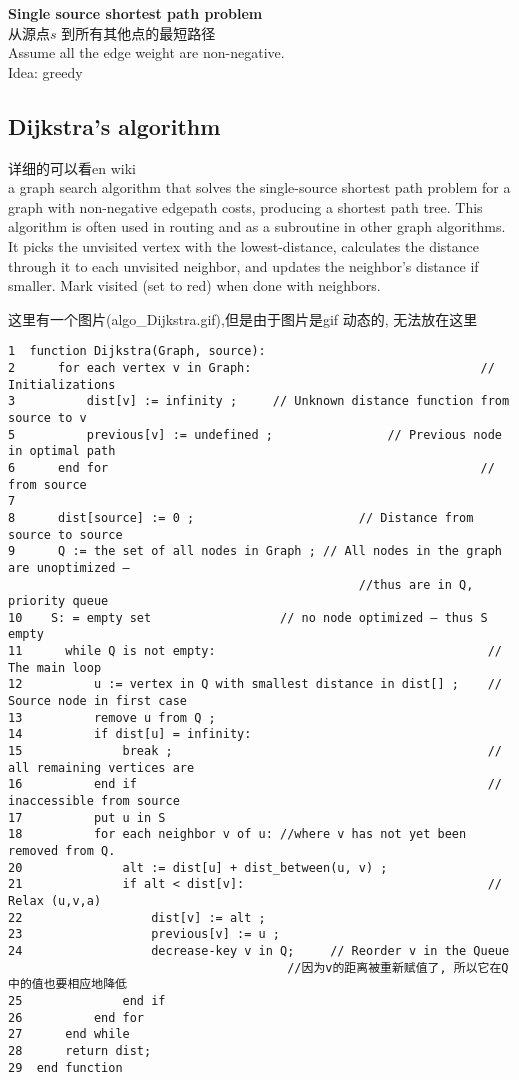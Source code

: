 \documentclass{article}
\begin{document}
\textbf{Single source shortest path problem}\\
从源点$s$ 到所有其他点的最短路径\\
Assume all the edge weight are non-negative.\\
Idea: greedy

\subsection{Dijkstra's algorithm}
详细的可以看en wiki\\
a graph search algorithm that solves the single-source shortest path problem for a graph with non-negative edgepath costs, producing a shortest path tree. This algorithm is often used in routing and as a subroutine in other graph algorithms.\\
It picks the unvisited vertex with the lowest-distance, calculates the distance through it to each unvisited neighbor, and updates the neighbor's distance if smaller. Mark visited (set to red) when done with neighbors.

这里有一个图片(algo\_Dijkstra.gif),但是由于图片是gif 动态的, 无法放在这里
\begin{verbatim}
1  function Dijkstra(Graph, source):
2      for each vertex v in Graph:                                // Initializations
3          dist[v] := infinity ;     // Unknown distance function from source to v
5          previous[v] := undefined ;                // Previous node in optimal path
6      end for                                                    // from source
7
8      dist[source] := 0 ;                       // Distance from source to source
9      Q := the set of all nodes in Graph ; // All nodes in the graph are unoptimized –
                                                 //thus are in Q, priority queue
10    S: = empty set                  // no node optimized – thus S empty
11      while Q is not empty:                                      // The main loop
12          u := vertex in Q with smallest distance in dist[] ;    // Source node in first case
13          remove u from Q ;
14          if dist[u] = infinity:
15              break ;                                            // all remaining vertices are
16          end if                                                 // inaccessible from source
17          put u in S
18          for each neighbor v of u: //where v has not yet been removed from Q.
20              alt := dist[u] + dist_between(u, v) ;
21              if alt < dist[v]:                                  // Relax (u,v,a)
22                  dist[v] := alt ;
23                  previous[v] := u ;
24                  decrease-key v in Q;     // Reorder v in the Queue
                                       //因为v的距离被重新赋值了, 所以它在Q中的值也要相应地降低
25              end if
26          end for
27      end while
28      return dist;
29  end function
\end{verbatim}
\end{document}
